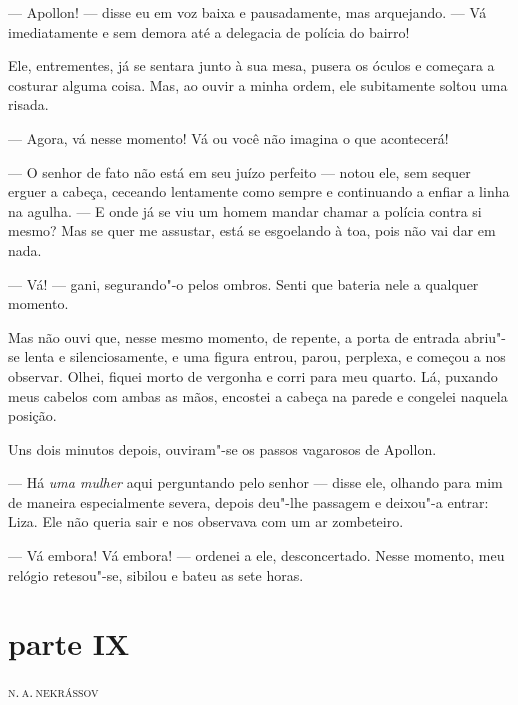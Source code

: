 --- Apollon! --- disse eu em voz baixa e pausadamente, mas arquejando. --- Vá
imediatamente e sem demora até a delegacia de polícia do bairro!

Ele, entrementes, já se sentara junto à sua mesa, pusera os óculos e
começara a costurar alguma coisa. Mas, ao ouvir a minha ordem, ele
subitamente soltou uma risada.

--- Agora, vá nesse momento! Vá ou você não imagina o que acontecerá!

--- O senhor de fato não está em seu juízo perfeito --- notou ele, sem
sequer erguer a cabeça, ceceando lentamente como sempre e continuando a
enfiar a linha na agulha. --- E onde já se viu um homem mandar chamar a
polícia contra si mesmo? Mas se quer me assustar, está se esgoelando à
toa, pois não vai dar em nada.

--- Vá! --- gani, segurando"-o pelos ombros. Senti que bateria nele a
qualquer momento.

Mas não ouvi que, nesse mesmo momento, de repente, a porta de entrada
abriu"-se lenta e silenciosamente, e uma figura entrou, parou, perplexa,
e começou a nos observar. Olhei, fiquei morto de vergonha e corri para
meu quarto. Lá, puxando meus cabelos com ambas as mãos, encostei a
cabeça na parede e congelei naquela posição.

Uns dois minutos depois, ouviram"-se os passos vagarosos de Apollon.

--- Há \textit{uma mulher} aqui perguntando pelo
senhor --- disse ele, olhando para mim de maneira especialmente severa,
depois deu"-lhe passagem e deixou"-a entrar: Liza. Ele não queria sair e
nos observava com um ar zombeteiro.

--- Vá embora! Vá embora! --- ordenei a ele, desconcertado. Nesse momento,
meu relógio retesou"-se, sibilou e bateu as sete horas.


\section{parte IX}

\setlength{\epigraphwidth}{.55\textwidth}
\begin{epigraphs} 
{\textsc{n.\,a.\,nekrássov}}
\end{epigraphs}

\noindent{}

